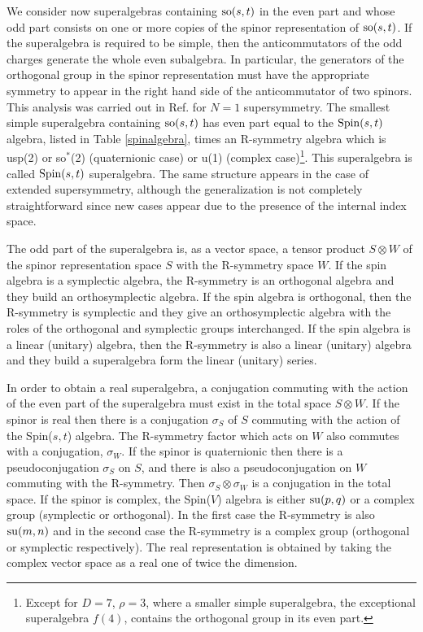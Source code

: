 \documentclass[a4paper,12pt]{article}
\begin{document}
We consider now superalgebras containing ${\rm so}(s,t)$ in the
even part and  whose odd part  consists on one or more copies of
the spinor representation of ${\rm so}(s,t)$. If the superalgebra
is required to be simple, then the anticommutators of the odd
charges generate the whole even subalgebra. In particular, the
generators of the orthogonal group in the spinor representation
must have the appropriate symmetry to appear in the right hand
side of the anticommutator of two spinors. This analysis was
carried out in Ref. \cite{dflv} for $N=1$ supersymmetry. The
smallest simple superalgebra containing ${\rm so}(s,t)$ has even
part equal to the ${\rm Spin}(s,t)$ algebra, listed in Table
\ref{spinalgebra}, times an R-symmetry algebra which is  usp(2) or
so$^*$(2) (quaternionic case) or u(1) (complex
case)\footnote{Except for $D=7$, $\rho=3$, where a smaller simple
superalgebra, the exceptional superalgebra $f(4)$, contains the
orthogonal group in its even part.}. This superalgebra is called
${\rm Spin}(s,t)$ superalgebra. The same structure appears in the
case of extended supersymmetry, although the generalization is not
completely straightforward since new cases appear due to the
presence of the internal index space.

The odd part of the superalgebra is, as a vector space, a tensor
product $S\otimes W$ of the spinor representation space $S$  with
the R-symmetry space $W$. If the spin algebra is a symplectic
algebra, the R-symmetry is an orthogonal algebra and they build an
orthosymplectic algebra. If the spin algebra is orthogonal, then
the R-symmetry is symplectic and they give an orthosymplectic
algebra with the roles of the orthogonal and symplectic groups
interchanged. If the spin algebra is a linear (unitary) algebra,
then the R-symmetry is also a linear (unitary) algebra and they
build a superalgebra form the linear (unitary) series.

In order to obtain a real superalgebra, a conjugation commuting
with the action of the even part of the superalgebra must exist in
the total space $S\otimes W$. If the spinor is real then there is
a conjugation $\sigma_S$ of $S$ commuting with the action of the
Spin($s,t$) algebra.  The R-symmetry factor which acts on $W$ also
commutes with  a conjugation, $\sigma_W$.  If the spinor is
quaternionic then there is a pseudoconjugation $\sigma_S$ on $S$,
and  there is also a pseudoconjugation on $W$ commuting with the
R-symmetry. Then $\sigma_S\otimes\sigma_W$ is a conjugation in the
total space. If the spinor is complex,  the Spin($V$) algebra is
either ${\rm su}(p,q)$ or a  complex group (symplectic or
orthogonal). In the first case the R-symmetry is also ${\rm
su}(m,n)$
and in the second case the R-symmetry is a complex group
(orthogonal or symplectic respectively). The real representation
is obtained by taking the complex vector space as a real one of
twice the dimension.
\end{document}
